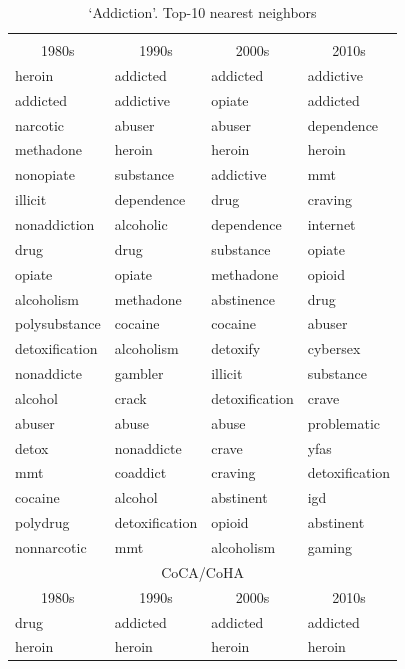 \documentclass[output=paper]{langsci/langscibook}
\begin{document}
\begin{table}
\footnotesize
\caption{`Addiction'. Top-10 nearest neighbors\label{tab:addiction-nns}}
\begin{tabular}{llll}
\lsptoprule
\multicolumn{4}{c}{Psychology}\\
\multicolumn{1}{c}{1980s} & \multicolumn{1}{c}{1990s}  & \multicolumn{1}{c}{2000s} & \multicolumn{1}{c}{2010s}\\\midrule
heroin&addicted&addicted&addictive         \\   
addicted&addictive&opiate&addicted         \\   
narcotic&abuser&abuser&dependence          \\   
methadone&heroin&heroin&heroin             \\   
nonopiate&substance&addictive&mmt          \\   
illicit&dependence&drug&craving            \\   
nonaddiction&alcoholic&dependence&internet \\   
drug&drug&substance&opiate                 \\   
opiate&opiate&methadone&opioid             \\   
alcoholism&methadone&abstinence&drug       \\   
polysubstance&cocaine&cocaine&abuser       \\   
detoxification&alcoholism&detoxify&cybersex\\   
nonaddicte&gambler&illicit&substance       \\   
alcohol&crack&detoxification&crave         \\   
abuser&abuse&abuse&problematic             \\   
detox&nonaddicte&crave&yfas                \\   
mmt&coaddict&craving&detoxification        \\   
cocaine&alcohol&abstinent&igd              \\   
polydrug&detoxification&opioid&abstinent   \\   
nonnarcotic&mmt&alcoholism&gaming          \\\midrule
\multicolumn{4}{c}{CoCA/CoHA}\\
\multicolumn{1}{c}{1980s} & \multicolumn{1}{c}{1990s}  & \multicolumn{1}{c}{2000s} & \multicolumn{1}{c}{2010s}\\\midrule
drug&addicted&addicted&addicted\\
heroin&heroin&heroin&heroin\\

\end{tabular}
\end{table}
\end{document}
